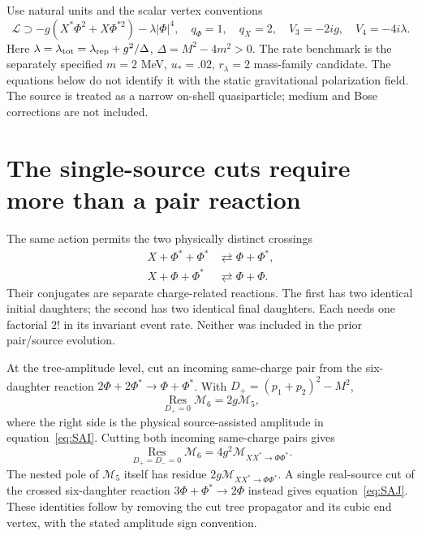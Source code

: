 \documentclass[11pt]{article}
\begin{document}
Use natural units and the scalar vertex conventions
\begin{equation}
 \mathcal L\supset-g(X^*\Phi^2+X\Phi^{*2})-\lambda|\Phi|^4,
 \quad q_\Phi=1,\quad q_X=2,
 \quad V_3=-2ig,\quad V_4=-4i\lambda.
\end{equation}
Here $\lambda=\lambda_{\rm tot}=\lambda_{\rm rep}+g^2/\Delta$,
$\Delta=M^2-4m^2>0$. The rate benchmark is the separately specified
$m=2$ MeV, $u_*=.02$, $r_\lambda=2$ mass-family candidate.
The equations below do not identify it with the static gravitational
polarization field. The source is treated as a narrow on-shell quasiparticle;
medium and Bose corrections are not included.

\section{The single-source cuts require more than a pair reaction}
The same action permits the two physically distinct crossings
\begin{align}
 X+\Phi^*+\Phi^*&\rightleftarrows\Phi+\Phi^*,\label{eq:SAI}\\
 X+\Phi+\Phi^*&\rightleftarrows\Phi+\Phi.\label{eq:SAJ}
\end{align}
Their conjugates are separate charge-related reactions. The first has
two identical initial daughters; the second has two identical final
daughters. Each needs one factorial $2!$ in its invariant event rate.
Neither was included in the prior pair/source evolution.

At the tree-amplitude level, cut an incoming same-charge pair from the
six-daughter reaction $2\Phi+2\Phi^*\to\Phi+\Phi^*$. With
$D_+=(p_1+p_2)^2-M^2$,
\begin{equation}
 \operatorname*{Res}_{D_+=0}\mathcal M_6=2g\mathcal M_5,
\end{equation}
where the right side is the physical source-assisted amplitude in
equation~\eqref{eq:SAI}. Cutting both incoming same-charge pairs gives
\begin{equation}
 \operatorname*{Res}_{D_+=D_-=0}\mathcal M_6
 =4g^2\mathcal M_{XX^*\to\Phi\Phi^*}.
\end{equation}
The nested pole of $\mathcal M_5$ itself has residue
$2g\mathcal M_{XX^*\to\Phi\Phi^*}$. A single real-source cut of the crossed
six-daughter reaction $3\Phi+\Phi^*\to2\Phi$ instead gives
equation~\eqref{eq:SAJ}. These identities follow by removing the cut tree
propagator and its cubic end vertex, with the stated amplitude sign convention.
\end{document}
